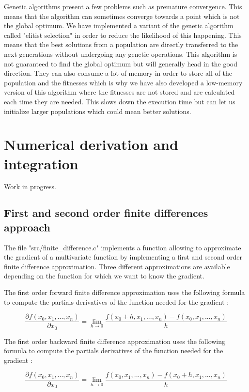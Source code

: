 \documentclass{book}
\begin{document}
Genetic algorithms present a few problems such as premature convergence. This means that the algorithm can sometimes converge towards a point which is not the global
optimum. We have implemented a variant of the genetic algorithm called "elitist selection" in order to reduce the likelihood of this happening. This means that the best solutions from a population are directly transferred
to the next generations without undergoing any genetic operations. This algorithm is not guaranteed to find the global optimum but will generally head in the good direction. They can also consume a lot of memory in order to store all of the population
and the fitnesses which is why we have also developed a low-memory version of this algorithm where the fitnesses are not stored and are calculated each time they are needed.
This slows down the execution time but can let us initialize larger populations which could mean better solutions.





\section{Numerical derivation and integration}

Work in progress.

\subsection{First and second order finite differences approach}

The file "src/finite\_difference.c" implements a function allowing to approximate the gradient of a multivariate function by implementing a first and second order finite difference approximation. Three different approximations are available depending on the function for which we want to know the gradient.

The first order forward finite difference approximation uses the following formula to compute the partials derivatives of the function needed for the gradient :

$$
\frac{\partial{f(x_0, x_1, ..., x_n)}}{\partial{x_0}} = \lim_{h\to 0} \frac{f(x_0 + h, x_1, ..., x_n) - f(x_0, x_1, ..., x_n)}{h}
$$

The first order backward finite difference approximation uses the following formula to compute the partials derivatives of the function needed for the gradient :

$$
\frac{\partial{f(x_0, x_1, ..., x_n)}}{\partial{x_0}} = \lim_{h\to 0} \frac{f(x_0, x_1, ..., x_n) - f(x_0 + h, x_1, ..., x_n)}{h}
$$
\end{document}
